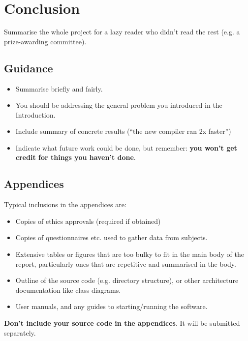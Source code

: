 \documentclass{l4proj}
\begin{document}
\chapter{Conclusion}    
Summarise the whole project for a lazy reader who didn't read the rest (e.g. a prize-awarding committee).
\section{Guidance}
\begin{itemize}
    \item
        Summarise briefly and fairly.
    \item
        You should be addressing the general problem you introduced in the
        Introduction.        
    \item
        Include summary of concrete results (``the new compiler ran 2x
        faster'')
    \item
        Indicate what future work could be done, but remember: \textbf{you
        won't get credit for things you haven't done}.
\end{itemize}

%
% 

\begin{appendices}

\chapter{Appendices}

Typical inclusions in the appendices are:

\begin{itemize}
\item
  Copies of ethics approvals (required if obtained)
\item
  Copies of questionnaires etc. used to gather data from subjects.
\item
  Extensive tables or figures that are too bulky to fit in the main body of
  the report, particularly ones that are repetitive and summarised in the body.

\item Outline of the source code (e.g. directory structure), or other architecture documentation like class diagrams.

\item User manuals, and any guides to starting/running the software.

\end{itemize}

\textbf{Don't include your source code in the appendices}. It will be
submitted separately.

\end{appendices}
\end{document}
